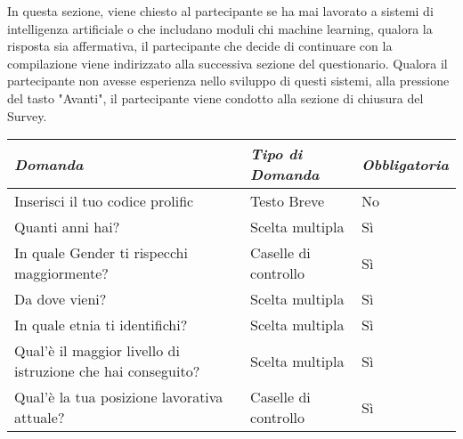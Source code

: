    In questa sezione, viene chiesto al partecipante se ha mai lavorato a sistemi di intelligenza artificiale o che includano moduli chi machine learning, qualora la risposta sia affermativa, il partecipante che decide di continuare con la compilazione viene indirizzato alla successiva sezione del questionario. Qualora il partecipante non avesse esperienza nello sviluppo di questi sistemi, alla pressione del tasto "Avanti", il partecipante viene condotto alla sezione di chiusura del Survey.
   
   \begin{longtable}{| p{} | p{} | p{} |} 
\hline\textbf{\textit{Domanda}} & \textbf{\textit{Tipo di Domanda}} & \textbf{\textit{Obbligatoria}}\\
\hline
\endhead 

\hline 
 Inserisci il tuo codice prolific

& Testo Breve

& No 

\\ \hline
\rowcolor{Gray}
Quanti anni hai?        

&  Scelta multipla

& Sì

\\ \hline

 In quale Gender ti rispecchi maggiormente?

& Caselle di controllo

& Sì

\\ \hline
\rowcolor{Gray}
Da dove vieni?        

&  Scelta multipla

& Sì

\\ 
\hline 
 In quale etnia ti identifichi?

& Scelta multipla

& Sì

\\ \hline

\rowcolor{Gray}
 Qual'è il maggior livello di istruzione che hai conseguito?

& Scelta multipla

& Sì

\\ \hline
Qual'è la tua posizione lavorativa attuale?        

&  Caselle di controllo

& Sì


\end{longtable}
